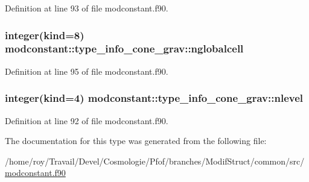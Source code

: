 Definition at line 93 of file modconstant.\-f90.

\hypertarget{structmodconstant_1_1type__info__cone__grav_ac294c3d2656e6cd6b7088726412cfe62}{
\subsubsection[{nglobalcell}]{\setlength{\rightskip}{0pt plus 5cm}integer(kind=8) modconstant\-::type\-\_\-info\-\_\-cone\-\_\-grav\-::nglobalcell}}\label{structmodconstant_1_1type__info__cone__grav_ac294c3d2656e6cd6b7088726412cfe62}


Definition at line 95 of file modconstant.\-f90.

\hypertarget{structmodconstant_1_1type__info__cone__grav_a55bb1c2c387ec91b81d634f99ac48d6d}{
\subsubsection[{nlevel}]{\setlength{\rightskip}{0pt plus 5cm}integer(kind=4) modconstant\-::type\-\_\-info\-\_\-cone\-\_\-grav\-::nlevel}}\label{structmodconstant_1_1type__info__cone__grav_a55bb1c2c387ec91b81d634f99ac48d6d}


Definition at line 92 of file modconstant.\-f90.



The documentation for this type was generated from the following file\-:\begin{DoxyCompactItemize}
\item 
/home/roy/\-Travail/\-Devel/\-Cosmologie/\-Pfof/branches/\-Modif\-Struct/common/src/\hyperlink{modconstant_8f90}{modconstant.\-f90}\end{DoxyCompactItemize}
